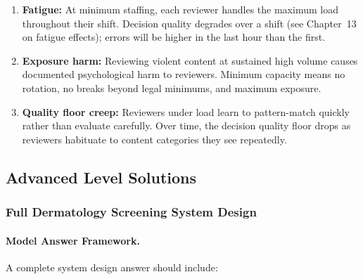 \begin{enumerate}
    \item \textbf{Fatigue:} At minimum staffing, each reviewer handles the maximum load throughout their shift. Decision quality degrades over a shift (see Chapter~13 on fatigue effects); errors will be higher in the last hour than the first.

    \item \textbf{Exposure harm:} Reviewing violent content at sustained high volume causes documented psychological harm to reviewers. Minimum capacity means no rotation, no breaks beyond legal minimums, and maximum exposure.

    \item \textbf{Quality floor creep:} Reviewers under load learn to pattern-match quickly rather than evaluate carefully. Over time, the decision quality floor drops as reviewers habituate to content categories they see repeatedly.
\end{enumerate}

\subsection{Advanced Level Solutions}

\subsubsection{Full Dermatology Screening System Design}

\paragraph{Model Answer Framework.}

A complete system design answer should include:

